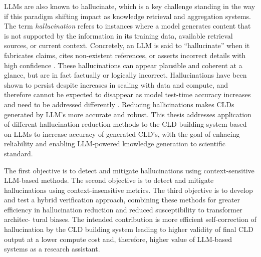 
LLMs are also known to hallucinate, which is a key challenge standing in the way if this paradigm shifting impact as knowledge retrieval and aggregation systems. The term \emph{hallucination} refers to instances where a model generates content that is not supported by the information in its training data, available retrieval sources, or current context. Concretely, an LLM is said to “hallucinate” when it fabricates claims, cites non-existent references, or asserts incorrect details with high confidence \cite{zhao2023explainability, zheng2023judging}. These hallucinations can appear plausible and coherent at a glance, but are in fact factually or logically incorrect. Hallucinations have been shown to persist despite increases in scaling with data and compute, and therefore cannot be expected to disappear as model test-time accuracy increases and need to be addressed differently \cite{varshney2023stitch}. 
Reducing hallicinations makes CLDs generated by LLM's more accurate and robust. This thesis addresses application of different hallucination reduction methods to the CLD building system based on LLMs to increase accuracy of generated CLD's, with the goal of enhacing reliability and enabling LLM-powered knowledge generation to scientific standard.

The first objective is to detect and mitigate hallucinations using
context-sensitive LLM-based methods.
The second objective is to detect and mitigate hallucinations using context-insensitive metrics.
The third objective is to develop and test a hybrid verification approach, combining
these methods for greater efficiency in hallucination reduction and reduced susceptibility to transformer architec-
tural biases.
The intended contribution is more efficient self-correction of hallucination by the CLD building system leading to higher validity of final CLD output at a lower compute cost and, therefore, higher value of LLM-based systems as a research assistant.

